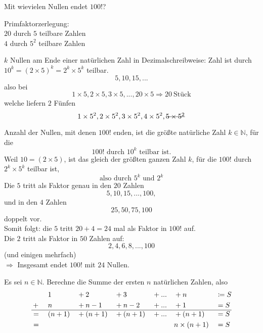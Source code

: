 \documentclass[a4paper, markcase = upper, parskip = true, fleqn]{scrartcl}
\begin{document}
\begin{problembox}
	Mit wievielen Nullen endet $100!$?\par
	Primfaktorzerlegung:\\
	$20$ durch $5$ teilbare Zahlen\\
	$4$ durch $5^2$ teilbare Zahlen\par
	$k$ Nullen am Ende einer natürlichen Zahl in Dezimalschreibweise: Zahl ist durch $10^k = \left( 2 \times 5 \right)^k = 2^k  \times 5^k$ teilbar.
	\[5, 10, 15, ...\]
	also bei
	\[1 \times 5, 2 \times 5, 3 \times 5, ..., 20 \times 5 \Rightarrow \qty{20}{\text{Stück}}\]
	welche liefern $2$ Fünfen
	\[1 \times 5^2, 2 \times 5^2, 3 \times 5^2, 4 \times 5^2, \text{\hbox{\sout{$5 \times 5^2$}}}\]\par
	Anzahl der Nullen, mit denen $100!$ enden, ist die größte natürliche Zahl $k \in \mathbb{N}$, für die
	\[100! \text{ durch } 10^k \text{ teilbar ist.}\]
	Weil $10 = (2 \times 5)$, ist das gleich der größten ganzen Zahl $k$, für die $100!$ durch $2^k \times 5^k$ teilbar ist,
	\[\text{also durch } 5^k \text{ und } 2^k\]
	Die $5$ tritt als Faktor genau in den $20$ Zahlen
	\[5, 10, 15, ..., 100,\]
	und in den $4$ Zahlen
	\[25, 50, 75, 100\]
	doppelt vor.\\
	Somit folgt: die $5$ tritt $20 + 4 = 24$ mal als Faktor in $100!$ auf.\\
	Die $2$ tritt als Faktor in $50$ Zahlen auf:
	\[2, 4, 6, 8, ..., 100\]
	(und einigen mehrfach)\\
	$\Rightarrow$ Insgesamt endet $100!$ mit $24$ Nullen.
\end{problembox}

\begin{problembox}
	Es sei $n \in \mathbb{N}$. Berechne die Summe der ersten $n$ natürlichen Zahlen, also
	\begin{alignat*}{7}
		&~{}	&&1		&&+ 2		&&+ 3		&&+ ... &&+ n			&&\coloneqq S\\
		&+{} 	&&n		&&+ n - 1	&&+ n - 2	&&+ ... &&+ 1			&&= S\\
		\hline
		&={} 	&&(n+1)		&&+(n+1)	&&+(n+1)	&&+ ... &&+(n+1)		&&= S\\
		&={} 	&&~		&&~		&&~		&&~	&&n\times (n + 1)	&&= S
	\end{alignat*}
\end{problembox}
\end{document}
